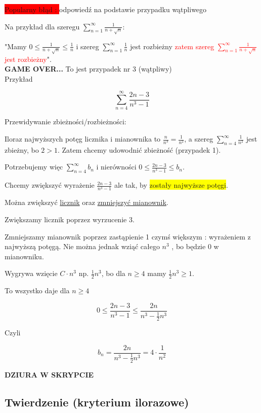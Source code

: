 \colorbox{red}{Popularny błąd : } odpowiedź na podstawie przypadku wątpliwego

Na przykład dla szeregu $ \sum\limits_{n = 1}^{\infty} \frac{1}{n + \sqrt{n}} : $

"Mamy $ 0 \leq \frac{1}{n + \sqrt{n}} \leq \frac{1}{n} $ i szereg $ \sum\limits_{n = 1}^{\infty} \frac{1}{n} $
jest rozbieżny \textcolor{red}{zatem szereg $\sum\limits_{n = 1}^{\infty} \frac{1}{n + \sqrt{n}}$ jest rozbieżny}". \\

\textbf{GAME OVER...} To jest przypadek nr 3 (wątpliwy) \\

Przykład

$$ \sum\limits_{n = 4}^{\infty} \frac{2n - 3}{n^3 - 1} $$

Przewidywanie zbieżności/rozbieżności:

Iloraz najwyższych potęg licznika i mianownika to $ \frac{n}{n^3} = \frac{1}{n^2} $, a szereg $ \sum\limits_{n = 4}^{\infty} \frac{1}{n^2} $
jest zbieżny, bo $ 2 > 1 $. Zatem chcemy udowodnić zbieżność (przypadek 1).

Potrzebujemy więc $ \sum\limits_{n = 4}^{\infty} b_n $ i nierówności $ 0 \leq \frac{2n - 3}{n^3 - 1} \leq b_n $.

Chcemy zwiększyć wyrażenie $ \frac{2n - 3}{n^3 - 1} $ ale tak, by \colorbox{yellow}{zostały najwyższe potęgi}.

Można zwiększyć \underline{licznik} oraz \underline{zmniejszyć mianownik}.

Zwiększamy licznik poprzez wyrzucenie 3.

Zmniejszamy mianownik poprzez zastąpienie 1 czymś większym : wyrażeniem z najwyższą potęgą. Nie można jednak wziąć całego $n^3$
, bo będzie 0 w mianowniku.

Wygrywa wzięcie $ C \cdot n^3 $ np. $ \frac{1}{2} n^3 $, bo dla $ n \geq 4 $ mamy $ \frac{1}{2} n^3 \geq 1 $.

To wszystko daje dla $ n \geq 4 $

$$ 0 \leq \frac{2n - 3}{n^3 - 1} \leq \frac{2n}{n^3 - \frac{1}{2} n^3} $$

Czyli

$$ b_n = \frac{2n}{n^3 - \frac{1}{2}n^3} = 4 \cdot \frac{1}{n^2} $$

\textbf{DZIURA W SKRYPCIE}

\subsection*{Twierdzenie (kryterium ilorazowe)}

